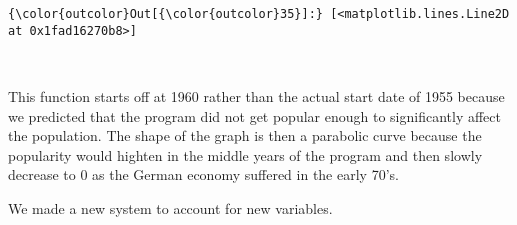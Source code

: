 \documentclass[11pt]{article}
\begin{document}
\begin{Verbatim}[commandchars=\\\{\}]
{\color{outcolor}Out[{\color{outcolor}35}]:} [<matplotlib.lines.Line2D at 0x1fad16270b8>]
\end{Verbatim}
            
    \begin{center}
    \end{center}
    { \hspace*{\fill} \\}
    
    This function starts off at 1960 rather than the actual start date of
1955 because we predicted that the program did not get popular enough to
significantly affect the population. The shape of the graph is then a
parabolic curve because the popularity would highten in the middle years
of the program and then slowly decrease to 0 as the German economy
suffered in the early 70's.

    We made a new system to account for new variables.
\end{document}
